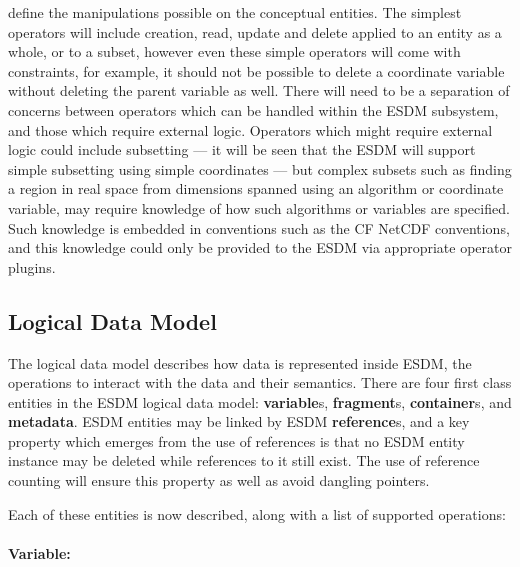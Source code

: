 define the manipulations possible on the conceptual entities.
The simplest operators will include creation, read, update and delete applied to an entity as a whole, or to a subset, however even these simple operators will come with constraints, for example, it should not be possible to delete a coordinate variable without deleting the parent variable as well.
There will need to be a separation of concerns between operators which can be handled within the ESDM subsystem, and those which require external logic.
Operators which might require external logic could include subsetting --- it will be seen that the ESDM will support simple subsetting using simple coordinates --- but complex subsets such as finding a region in real space from dimensions spanned using an algorithm or coordinate variable, may require knowledge of how such algorithms or variables are specified.
Such knowledge is embedded in conventions such as the CF NetCDF conventions, and this knowledge could only be provided to the ESDM via appropriate operator plugins.
 
\subsection{Logical Data Model}

The logical data model describes how data is represented inside ESDM, the operations to interact with the data and their semantics.
There are four first class entities in the ESDM logical data model: \textbf{variable}s, \textbf{fragment}s, \textbf{container}s, and \textbf{metadata}.
ESDM entities may be linked by ESDM \textbf{reference}s, and a key property which emerges from the use of references is that no ESDM entity instance may be deleted while references to it still exist.
The use of reference counting will ensure this property as well as avoid dangling pointers.
 

Each of these entities is now described, along with a list of supported operations:

\paragraph{Variable:}%
\label{variable-1}

